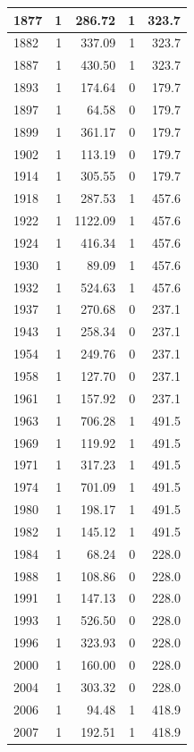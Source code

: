 \documentclass[
  spanish,
  12pt,
]{book}
\begin{document}
\begin{tabular}{l|r|r|r|r}
\hline
1877 & 1 & 286.72 & 1 & 323.7\\
\hline
1882 & 1 & 337.09 & 1 & 323.7\\
\hline
1887 & 1 & 430.50 & 1 & 323.7\\
\hline
1893 & 1 & 174.64 & 0 & 179.7\\
\hline
1897 & 1 & 64.58 & 0 & 179.7\\
\hline
1899 & 1 & 361.17 & 0 & 179.7\\
\hline
1902 & 1 & 113.19 & 0 & 179.7\\
\hline
1914 & 1 & 305.55 & 0 & 179.7\\
\hline
1918 & 1 & 287.53 & 1 & 457.6\\
\hline
1922 & 1 & 1122.09 & 1 & 457.6\\
\hline
1924 & 1 & 416.34 & 1 & 457.6\\
\hline
1930 & 1 & 89.09 & 1 & 457.6\\
\hline
1932 & 1 & 524.63 & 1 & 457.6\\
\hline
1937 & 1 & 270.68 & 0 & 237.1\\
\hline
1943 & 1 & 258.34 & 0 & 237.1\\
\hline
1954 & 1 & 249.76 & 0 & 237.1\\
\hline
1958 & 1 & 127.70 & 0 & 237.1\\
\hline
1961 & 1 & 157.92 & 0 & 237.1\\
\hline
1963 & 1 & 706.28 & 1 & 491.5\\
\hline
1969 & 1 & 119.92 & 1 & 491.5\\
\hline
1971 & 1 & 317.23 & 1 & 491.5\\
\hline
1974 & 1 & 701.09 & 1 & 491.5\\
\hline
1980 & 1 & 198.17 & 1 & 491.5\\
\hline
1982 & 1 & 145.12 & 1 & 491.5\\
\hline
1984 & 1 & 68.24 & 0 & 228.0\\
\hline
1988 & 1 & 108.86 & 0 & 228.0\\
\hline
1991 & 1 & 147.13 & 0 & 228.0\\
\hline
1993 & 1 & 526.50 & 0 & 228.0\\
\hline
1996 & 1 & 323.93 & 0 & 228.0\\
\hline
2000 & 1 & 160.00 & 0 & 228.0\\
\hline
2004 & 1 & 303.32 & 0 & 228.0\\
\hline
2006 & 1 & 94.48 & 1 & 418.9\\
\hline
2007 & 1 & 192.51 & 1 & 418.9\\

\end{tabular}
\end{document}
